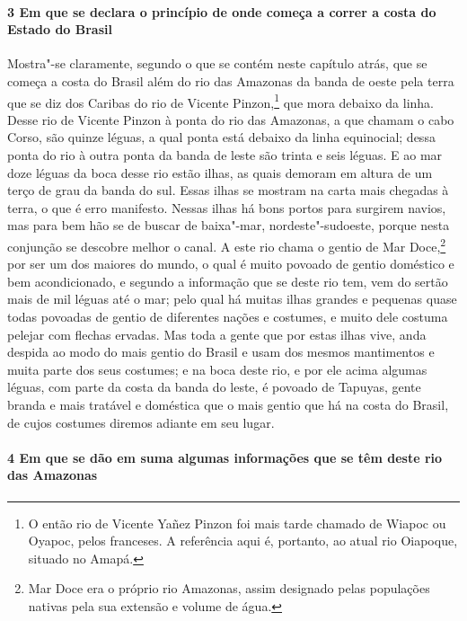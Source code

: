 \paragraph{3 Em que se declara o princípio de onde começa a correr a costa do Estado do
Brasil}

Mostra"-se claramente, segundo o que se contém neste capítulo atrás, que se começa a costa
do Brasil além do rio das Amazonas da banda de oeste pela terra que se diz dos Caribas do
rio de Vicente Pinzon,\footnote{ O então rio de Vicente Yañez Pinzon foi mais tarde
chamado de Wiapoc ou Oyapoc, pelos franceses. A referência aqui é, portanto, ao atual rio
Oiapoque, situado no Amapá.} que mora debaixo da linha. Desse rio de Vicente Pinzon à
ponta do rio das Amazonas, a que chamam o cabo Corso, são quinze léguas, a qual ponta está
debaixo da linha equinocial; dessa ponta do rio à outra ponta da banda de leste são trinta
e seis léguas. E ao mar doze léguas da boca desse rio estão ilhas, as quais demoram em
altura de um terço de grau da banda do sul. Essas ilhas se mostram na carta mais chegadas
à terra, o que é erro manifesto. Nessas ilhas há bons portos para surgirem navios, mas
para bem hão se de buscar de baixa"-mar, nordeste"-sudoeste, porque nesta conjunção se
descobre melhor o canal. A este rio chama o gentio de Mar Doce,\footnote{ Mar Doce era o
próprio rio Amazonas, assim designado pelas populações nativas pela sua extensão e volume
de água.} por ser um dos maiores do mundo, o qual é muito povoado de gentio doméstico e
bem acondicionado, e segundo a informação que se deste rio tem, vem do sertão mais de mil
léguas até o mar; pelo qual há muitas ilhas grandes e pequenas quase todas povoadas de
gentio de diferentes nações e costumes, e muito dele costuma pelejar com flechas ervadas.
Mas toda a gente que por estas ilhas vive, anda despida ao modo do mais gentio do Brasil e
usam dos mesmos mantimentos e muita parte dos seus costumes; e na boca deste rio, e por
ele acima algumas léguas, com parte da costa da banda do leste, é povoado de Tapuyas,
gente branda e mais tratável e doméstica que o mais gentio que há na costa do Brasil, de
cujos costumes diremos adiante em seu lugar.

\paragraph{4 Em que se dão em suma algumas informações que se têm deste rio das Amazonas}

